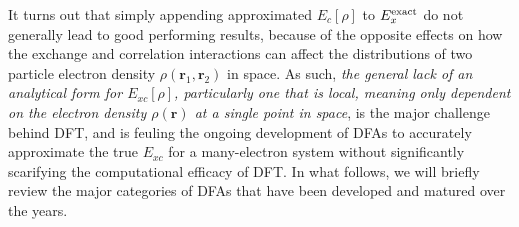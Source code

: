 It turns out that simply appending approximated $E_{c}[\rho]$ to $E_{x}^{\mbox{\scriptsize{exact}}}$ do not generally lead to good performing results, because of the opposite effects on how the exchange and correlation interactions can affect the distributions of two particle electron density $\rho(\bm{r}_{1},\bm{r}_{2})$ in space. As such, \emph{the general lack of an analytical  form for  $E_{xc}[\rho]$, particularly one that is local, meaning only dependent on the electron density $\rho(\bm{r})$ at a single point in space}, is the major challenge behind DFT, and is feuling the ongoing development of DFAs to accurately approximate the true $E_{xc}$ for a many-electron system without significantly scarifying the computational efficacy of DFT. In what follows, we will briefly review  the major categories of DFAs that have been developed and matured over the years.
